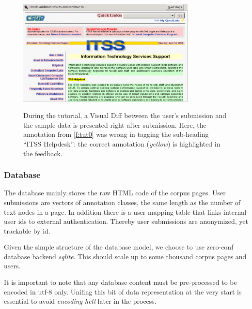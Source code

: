 \begin{figure}
	{\includegraphics[width=0.8\textwidth]{tut1}}
\caption{\label{f:tut1}During the tutorial, a Visual Diff between the user's submission and the sample data is presented right after submission.
	Here, the annotation from \ref{f:tut0} was wrong in tagging the sub-heading ``ITSS Helpdesk'': the correct annotation (\textit{yellow}) is highlighted in the feedback.}
\end{figure}

\subsubsection{Database}

The database mainly stores the raw HTML code of the corpus pages.
User submissions are vectors of annotation classes, the same length as the number of text nodes in a page.
In addition there is a user mapping table that links internal user ids to external authentication.
Thereby user submissions are anonymized, yet trackable by id.

Given the simple structure of the database model, we choose to use zero-conf database backend \textit{sqlite}.
This should scale up to some thousand corpus pages and users.

It is important to note that any database content must be pre-processed to be encoded in utf-8 only.
Unifing this bit of data representation at the very start is essential to avoid \textit{encoding hell} later in the process.
